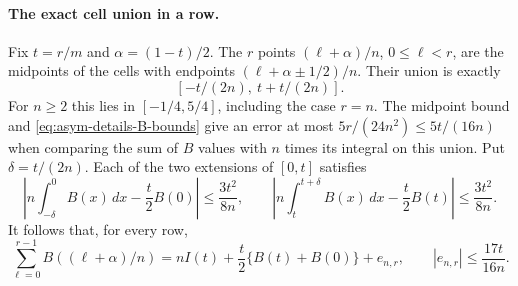 \paragraph{The exact cell union in a row.}
Fix $t=r/m$ and $\alpha=(1-t)/2$.  The $r$ points
$(\ell+\alpha)/n$, $0\leq\ell<r$, are the midpoints of the
cells with endpoints $(\ell+\alpha\pm1/2)/n$.  Their union is
exactly
\begin{equation}\label{eq:asym-details-row-cell-union}
 [-t/(2n),\ t+t/(2n)].
\end{equation}
For $n\geq2$ this lies in $[-1/4,5/4]$, including the case
$r=n$.  The midpoint bound and \eqref{eq:asym-details-B-bounds}
give an error at most $5r/(24n^2)\leq5t/(16n)$ when comparing
the sum of $B$ values with $n$ times its integral on this union.
Put $\delta=t/(2n)$.  Each of the two extensions of $[0,t]$
satisfies
\[
 \left|n\int_{-\delta}^{0}B(x)\,dx-\frac t2B(0)\right|
       \leq\frac{3t^2}{8n},\qquad
 \left|n\int_t^{t+\delta}B(x)\,dx-\frac t2B(t)\right|
       \leq\frac{3t^2}{8n}.
\]
It follows that, for every row,
\begin{equation}\label{eq:asym-details-smooth-row}
 \sum_{\ell=0}^{r-1}B((\ell+\alpha)/n)
     =nI(t)+\frac t2\{B(t)+B(0)\}+e_{n,r},
 \qquad |e_{n,r}|\leq\frac{17t}{16n}.
\end{equation}

